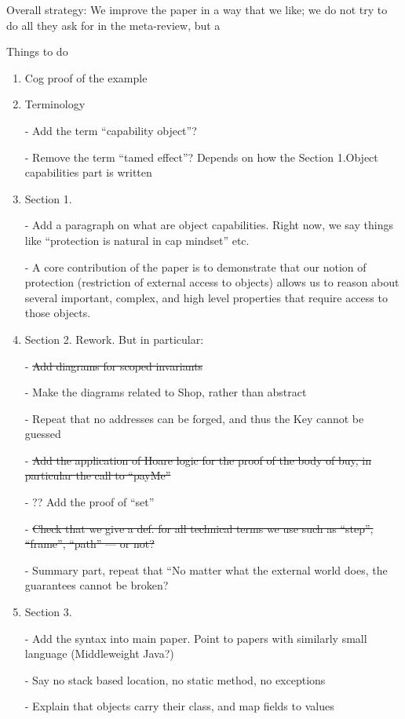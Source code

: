 \documentclass[acmsmall,review,anonymous]{acmart}\settopmatter{printfolios=true}
\begin{document}
Overall strategy: We improve the paper in a way that we like; we do not try to do all they ask for in the meta-review, but a


Things to do

\begin{enumerate}
\item
Cog proof of the example
\item
Terminology

- Add the term “capability object”?

- Remove the term “tamed effect”? Depends on how the Section 1.Object capabilities part is written

\item
Section 1. 

- Add a paragraph on what are object capabilities. Right now, we say things like “protection is natural in cap mindset” etc. 

- A core contribution of the paper is to demonstrate that our notion of protection (restriction of external access to objects) allows us to reason about several important, complex, and high level properties that require access to those objects.

\item
Section 2. Rework. But in particular:

- \st{Add diagrams for scoped invariants}

- Make the diagrams related to Shop, rather than abstract

- Repeat that no addresses can be forged, and thus the Key cannot be guessed

- \st{Add the application of Hoare logic for the proof of the body of buy, in particular the call to “payMe”}

- ?? Add the proof of “set” 

- \st{Check that we give a def. for all technical terms we use such as “step”, “frame”, “path” — or not?}

- Summary part, repeat that “No matter what the external world does, the guarantees cannot be broken?

\item
Section 3. 

- Add the syntax into main paper. Point to papers with similarly small language (Middleweight Java?) 

- Say no stack based location, no static method, no exceptions

- Explain that objects carry their class, and map fields to values


\end{enumerate}
\end{document}
